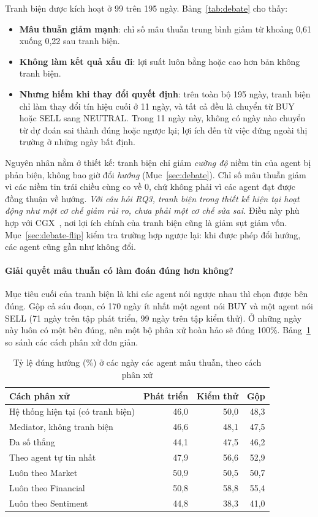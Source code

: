 Tranh biện được kích hoạt ở 99 trên 195 ngày. Bảng~\ref{tab:debate} cho thấy:
\begin{itemize}
  \item \textbf{Mâu thuẫn giảm mạnh}: chỉ số mâu thuẫn trung bình giảm từ khoảng 0,61 xuống 0,22 sau tranh biện.
  \item \textbf{Không làm kết quả xấu đi}: lợi suất luôn bằng hoặc cao hơn bản không tranh biện.
  \item \textbf{Nhưng hiếm khi thay đổi quyết định}: trên toàn bộ 195 ngày, tranh biện chỉ làm thay đổi tín hiệu cuối ở
  11 ngày, và tất cả đều là chuyển từ BUY hoặc SELL sang NEUTRAL. Trong 11 ngày này, không có ngày nào chuyển từ dự đoán
  sai thành đúng hoặc ngược lại; lợi ích đến từ việc đứng ngoài thị trường ở những ngày bất định.
\end{itemize}

Nguyên nhân nằm ở thiết kế: tranh biện chỉ giảm \emph{cường độ} niềm tin của agent bị phản biện, không bao giờ đổi
\emph{hướng} (Mục~\ref{sec:debate}). Chỉ số mâu thuẫn giảm vì các niềm tin trái chiều cùng co về 0, chứ không phải vì
các agent đạt được đồng thuận về hướng. \emph{Với câu hỏi RQ3, tranh biện trong thiết kế hiện tại hoạt động như một cơ chế
giảm rủi ro, chưa phải một cơ chế sửa sai.} Điều này phù hợp với CGX~\cite{bajgora2026cgx}, nơi lợi ích chính của
tranh biện cũng là giảm sụt giảm vốn. Mục~\ref{sec:debate-flip} kiểm tra trường hợp ngược lại: khi được phép
đổi hướng, các agent cũng gần như không đổi.

\paragraph{Giải quyết mâu thuẫn có làm đoán đúng hơn không?} Mục tiêu cuối của tranh biện là khi các agent nói ngược
nhau thì chọn được bên đúng. Gộp cả sáu đoạn, có 170 ngày ít nhất một agent nói BUY và một agent nói SELL (71 ngày trên
tập phát triển, 99 ngày trên tập kiểm thử). Ở những ngày này luôn có một bên đúng, nên một bộ phân xử hoàn hảo sẽ đúng
100\%. Bảng~\ref{tab:conflict-rules} so sánh các cách phân xử đơn giản.

\begin{table}[H]
\centering
\caption{Tỷ lệ đúng hướng (\%) ở các ngày các agent mâu thuẫn, theo cách phân xử}
\label{tab:conflict-rules}
\small
\begin{tabular}{lrrr}
\toprule
Cách phân xử & Phát triển & Kiểm thử & Gộp \\
\midrule
Hệ thống hiện tại (có tranh biện) & 46,0 & 50,0 & 48,3 \\
Mediator, không tranh biện & 46,6 & 48,1 & 47,5 \\
Đa số thắng & 44,1 & 47,5 & 46,2 \\
Theo agent tự tin nhất & 47,9 & 56,6 & 52,9 \\
Luôn theo Market & 50,9 & 50,5 & 50,7 \\
Luôn theo Financial & 50,8 & 58,8 & 55,4 \\
Luôn theo Sentiment & 44,8 & 38,3 & 41,0 \\
\bottomrule
\end{tabular}
\end{table}

